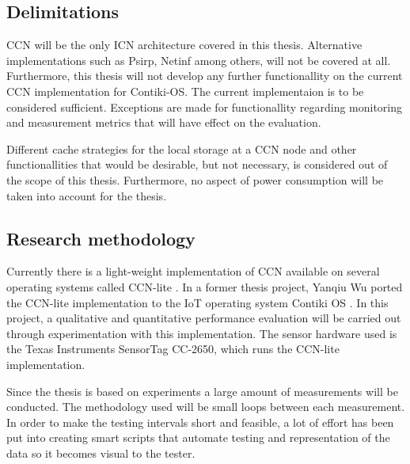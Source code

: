 \subsection{Delimitations}
CCN will be the only ICN architecture covered in this thesis. Alternative implementations such as Psirp, Netinf among others, will not be covered at all.
Furthermore, this thesis will not develop any further functionallity on the current CCN implementation for Contiki-OS. The current implementaion is to be considered sufficient. Exceptions are made for functionallity regarding monitoring and measurement metrics that will have effect on the evaluation. 

Different cache strategies for the local storage at a CCN node and other functionallities that would be desirable, but not necessary, is considered out of the scope of this thesis. Furthermore, no aspect of power consumption will be taken into account for the thesis.

\subsection{Research methodology}
Currently there is a light-weight implementation of CCN available on several operating systems called CCN-lite \cite{CCN-LITE}. In a former thesis project, Yanqiu Wu ported the CCN-lite implementation to the IoT operating system Contiki OS \cite{yanqui}. In this project, a qualitative and quantitative performance evaluation will be carried out through experimentation with this implementation. The sensor hardware used is the Texas Instruments SensorTag CC-2650, which runs the CCN-lite implementation. 

Since the thesis is based on experiments a large amount of measurements will be conducted. The methodology used will be  small loops between each measurement. %
In order to make the testing intervals short and feasible, a lot of effort has been put into creating smart scripts that automate testing and representation of the data so it becomes visual to the tester. 

